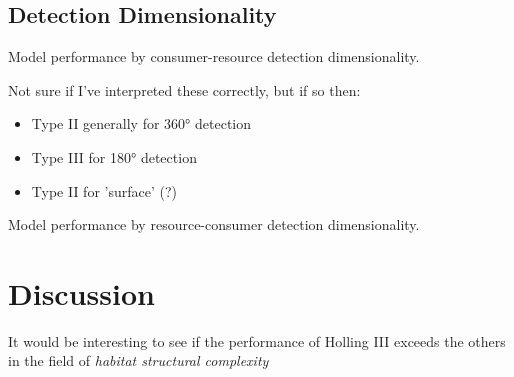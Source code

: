 \documentclass[11pt]{article}
\begin{document}
    \subsection{Detection Dimensionality}
    \begin{table}[ht!]
        \centering
        \caption{Model performance by consumer-resource detection dimensionality.}
    \end{table}
    
    Not sure if I've interpreted these correctly, but if so then:
     \begin{itemize}
      \item Type II generally for 360° detection
      \item Type III for 180° detection
      \item Type II for 'surface' (?)
    \end{itemize}
    
    \begin{table}[ht!]
        \centering
        \caption{Model performance by resource-consumer detection dimensionality.}
    \end{table}
    
    
    \section{Discussion}
    
    It would be interesting to see if the performance of Holling III exceeds the others in the field of \emph{habitat structural complexity} \parencite{pawar2012dimensionality}
    
\newpage
\printbibliography
\end{document}
